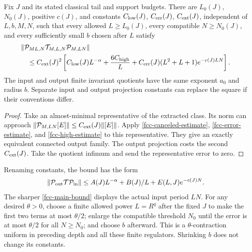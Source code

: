\begin{theorem}
\label{fcc-theorem}
Fix \(J\) and its stated classical tail and support
budgets. There are \(L_0(J)\), \(N_0(J)\), positive
\(c(J)\), and constants \(C_{\rm low}(J)\),
\(C_{\rm err}(J)\), \(C_{\rm ext}(J)\), independent
of \(L,b,M,N\), such that every allowed
\(L\ge L_0(J)\), every compatible \(N\ge N_0(J)\),
and every sufficiently small \(b\) chosen after \(L\)
satisfy
\begin{align}
 &\|\mathcal P_{ML,N}\mathcal T_{M,L,N}
                              \mathcal P_{M,LN}\|\notag\\
 &\quad\le C_{\rm ext}(J)^2
       \left[
       C_{\rm low}(J)L^{-\alpha}
       +\frac{6C_{\rm high}}L
       +C_{\rm err}(J)(L^2+L+1)e^{-c(J)LN}\right].
 \label{fcc-main-bound}
\end{align}
The input and output finite invariant quotients have
the same exponent \(a_0\) and radius \(b\).
Separate input and output projection constants can
replace the square if their conventions differ.
\end{theorem}

\begin{proof}
Take an almost-minimal representative of the extracted
class. Its norm can approach
\(\|\mathcal P_{M,LN}[E]\|\le C_{\rm ext}(J)\|[E]\|\).
Apply \eqref{fcc-canceled-estimate},
\eqref{fcc-error-estimate}, and
\eqref{fcc-high-estimate} to this representative.
They give an exactly equivalent connected output
family. The output projection costs the second
\(C_{\rm ext}(J)\). Take the quotient infimum and
send the representative error to zero.
\end{proof}

Renaming constants, the bound has the form
\begin{equation}
 \|\mathcal P_{\rm out}\mathcal T\mathcal P_{\rm in}\|
 \le A(J)L^{-\alpha}+B(J)/L
                       +E(L,J)e^{-c(J)N}.
 \label{fcc-renamed-bound}
\end{equation}
The sharper \eqref{fcc-main-bound} displays the actual
input period \(LN\). For any desired \(\theta>0\),
choose a finite allowed power \(L=R^q\) after the
fixed \(J\) to make the first two terms at most
\(\theta/2\); enlarge the compatible threshold
\(N_0\) until the error is at most \(\theta/2\) for
all \(N\ge N_0\); and choose \(b\) afterward.
This is a \(\theta\)-contraction uniform in preceding
depth and all these finite regulators. Shrinking
\(b\) does not change its constants.

